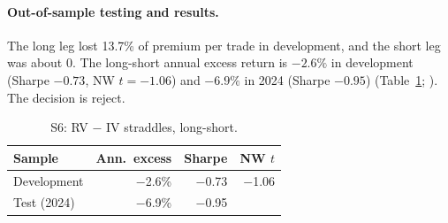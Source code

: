 \documentclass[../main.tex]{subfiles}
\begin{document}
\paragraph{Out-of-sample testing and results.}
The long leg lost 13.7\% of premium per trade in development, and the short leg was about 0. The long-short annual excess return is $-2.6\%$ in development (Sharpe $-0.73$, NW $t = -1.06$) and $-6.9\%$ in 2024 (Sharpe $-0.95$) (Table~\ref{tab:s6}; ). The decision is reject.

\begin{table}[tbp]
\centering\small
\caption{S6: RV $-$ IV straddles, long-short.}\label{tab:s6}
\begin{tabular}{@{}lrrr@{}}
\toprule
Sample & Ann.\ excess & Sharpe & NW $t$ \\
\midrule
Development & $-$2.6\% & $-$0.73 & $-$1.06 \\
Test (2024) & $-$6.9\% & $-$0.95 & \\
\bottomrule
\end{tabular}
\end{table}

\end{document}
